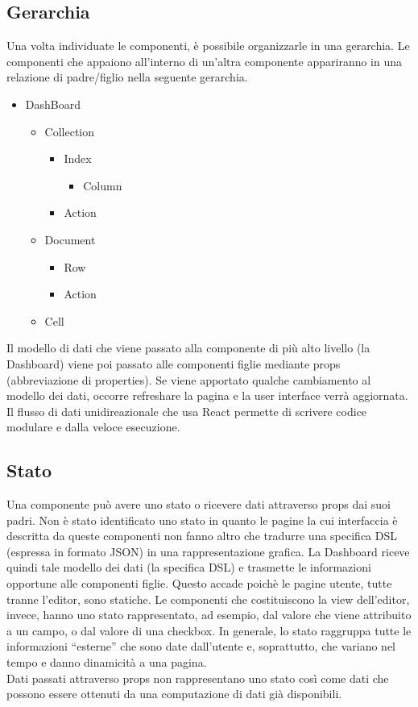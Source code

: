 \subsection{Gerarchia}
Una volta individuate le componenti, è possibile organizzarle in una gerarchia. Le componenti che appaiono all'interno di un'altra componente appariranno in una relazione di padre/figlio nella seguente gerarchia.
\begin{itemize}
\item DashBoard
  \begin{itemize}
  \item Collection
    \begin{itemize}
    \item Index
      \begin{itemize}
      \item Column
      \end{itemize}
    \item Action
    \end{itemize}
  \item Document
    \begin{itemize}
    \item Row
    \item Action
    \end{itemize}
  \item Cell
  \end{itemize}
\end{itemize} 
Il modello di dati che viene passato alla componente di più alto livello (la Dashboard) viene poi passato alle componenti figlie mediante props (abbreviazione di properties).
Se viene apportato qualche cambiamento al modello dei dati, occorre refreshare la pagina e la user interface verrà aggiornata. Il flusso di dati unidireazionale che usa React permette di scrivere codice modulare e dalla veloce esecuzione.
\subsection{Stato}
Una componente può avere uno stato o ricevere dati attraverso props dai suoi padri.
Non è stato identificato uno stato in quanto le pagine la cui interfaccia è descritta da queste componenti non fanno altro che tradurre una specifica DSL (espressa in formato JSON) in una rappresentazione grafica. La Dashboard riceve quindi tale modello dei dati (la specifica DSL) e trasmette le informazioni opportune alle componenti figlie. Questo accade poichè le pagine utente, tutte tranne l'editor, sono statiche.
Le componenti che costituiscono la view dell'editor, invece, hanno uno stato rappresentato, ad esempio, dal valore che viene attribuito a un campo, o dal valore di una checkbox. In generale, lo stato raggruppa tutte le informazioni ``esterne'' che sono date dall'utente e, soprattutto, che variano nel tempo e danno dinamicità a una pagina.\\
Dati passati attraverso props non rappresentano uno stato così come dati che possono essere ottenuti da una computazione di dati già disponibili.\\

